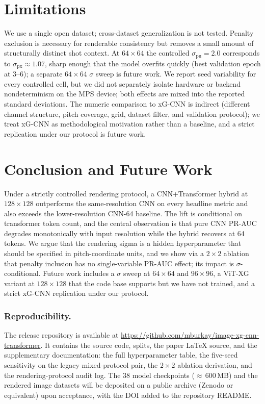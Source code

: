 \documentclass[runningheads,a4paper]{llncs}
\begin{document}
\section{Limitations}
\label{sec:limitations}

We use a single open dataset; cross-dataset generalization is not
tested. Penalty exclusion is necessary for renderable consistency but
removes a small amount of structurally distinct shot context. At
$64{\times}64$ the controlled $\sigma_{\text{pu}}=2.0$ corresponds to
$\sigma_{\text{px}}\approx 1.07$, sharp enough that the model overfits
quickly (best validation epoch at 3--6); a separate $64{\times}64$
$\sigma$ sweep is future work. We report seed variability for every
controlled cell, but we did not separately isolate hardware or backend
nondeterminism on the MPS device; both effects are mixed into the
reported standard deviations. The numeric comparison to xG-CNN is
indirect (different channel structure, pitch
coverage, grid, dataset filter, and validation protocol); we treat
xG-CNN as methodological motivation rather than a baseline, and a
strict replication under our protocol is future work.

\section{Conclusion and Future Work}
\label{sec:conclusion}

Under a strictly controlled rendering protocol, a CNN+Transformer
hybrid at $128{\times}128$ outperforms the same-resolution CNN on
every headline metric and also exceeds the lower-resolution CNN-64
baseline. The lift is
conditional on transformer token count, and the central observation
is that pure CNN PR-AUC degrades monotonically with input resolution
while the hybrid recovers at 64 tokens. We argue that the rendering
sigma is a hidden hyperparameter that should be specified in
pitch-coordinate units, and we show via a $2{\times}2$ ablation that
penalty inclusion has no single-variable PR-AUC effect; its impact is
$\sigma$-conditional. Future work includes a $\sigma$ sweep at
$64{\times}64$ and $96{\times}96$, a ViT-XG variant at $128{\times}128$
that the code base supports but we have not trained, and a strict
xG-CNN replication under our protocol.

\subsubsection*{Reproducibility.}
The release repository is available at
\url{https://github.com/mburkay/image-xg-cnn-transformer}. It contains the source code, splits,
the paper \LaTeX{} source, and the supplementary documentation: the
full hyperparameter table, the five-seed sensitivity on the legacy
mixed-protocol pair, the $2{\times}2$ ablation derivation, and the
rendering-protocol audit log. The 38 model checkpoints
(${\approx}\,600$\,MB) and the rendered image datasets will be
deposited on a public archive (Zenodo or equivalent) upon
acceptance, with the DOI added to the repository README.



\end{document}

